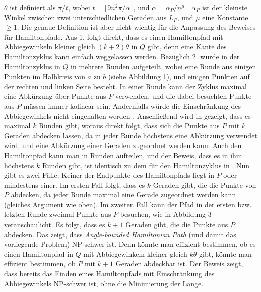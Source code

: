 \documentclass[a4paper, 10pt, ngerman]{article}
\begin{document}
$\theta$ ist definiert als $\pi / t$, wobei $t = \lceil 9 n^2 \pi / \alpha \rceil$, und $\alpha = \alpha_P / n^\mu$ \cite{nphard}. $\alpha_P$ ist der kleinste Winkel zwischen zwei unterschiedlichen Geraden aus $L_P$, und $\mu$ eine Konstante $\ge 1$. Die genaue Definition ist aber nicht wichtig für die Anpassung des Beweises für Hamiltonpfade. Aus 1. folgt direkt, dass es einen Hamiltonpfad mit Abbiegewinkeln kleiner gleich $(k + 2)\theta$ in $Q$ gibt, denn eine Kante des Hamiltonzyklus kann einfach weggelassen werden. Bezüglich 2. wurde in \cite{nphard} der Hamiltonzyklus in $Q$ in mehrere Runden aufgeteilt, wobei eine Runde aus einigen Punkten im Halbkreis von $a$ zu $b$ (siehe Abbildung 1), und einigen Punkten auf der rechten und linken Seite besteht. In einer Runde kann der Zyklus maximal eine Abkürzung über Punkte aus $P$ verwenden, und die dabei besuchten Punkte aus $P$ müssen immer kolinear sein. Andernfalls würde die Einschränkung des Abbiegewinkels nicht eingehalten werden \cite{nphard}. Anschließend wird in \cite{nphard} gezeigt, dass es maximal $k$ Runden gibt, woraus direkt folgt, dass sich die Punkte aus $P$ mit $k$ Geraden abdecken lassen, da in jeder Runde höchstens eine Abkürzung verwendet wird, und eine Abkürzung einer Geraden zugeordnet werden kann. Auch den Hamiltonpfad kann man in Runden aufteilen, und der Beweis, dass es in ihm höchstens $k$ Runden gibt, ist identisch zu dem für den Hamiltonzyklus in \cite{nphard}. Nun gibt es zwei Fälle: Keiner der Endpunkte des Hamiltonpfads liegt in $P$ oder mindestens einer. Im ersten Fall folgt, dass es $k$ Geraden gibt, die die Punkte von $P$ abdecken, da jeder Runde maximal eine Gerade zugeordnet werden kann (gleiches Argument wie oben). Im zweiten Fall kann der Pfad in der ersten bzw. letzten Runde zweimal Punkte aus $P$ besuchen, wie in Abbildung 3 veranschaulicht. Es folgt, dass es $k + 1$ Geraden gibt, die die Punkte aus $P$ abdecken. Das zeigt, dass \emph{Angle-bounded Hamiltonian Path} (und damit das vorliegende Problem) NP-schwer ist. Denn könnte man effizient bestimmen, ob es einen Hamiltonpfad in $Q$ mit Abbiegewinkeln kleiner gleich $k \theta$ gibt, könnte man effizient bestimmen, ob $P$ mit $k + 1$ Geraden abdeckbar ist. Der Beweis zeigt, dass bereits das Finden eines Hamiltonpfads mit Einschränkung des Abbiegewinkels NP-schwer ist, ohne die Minimierung der Länge.
\end{document}
